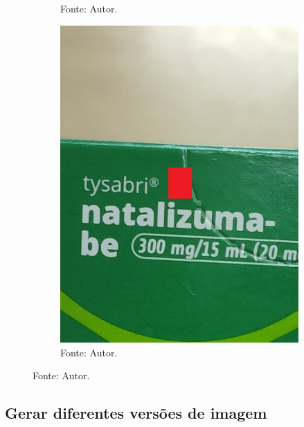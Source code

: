 \begin{figure}[htb]
\begin{subfigure}[t]{0.45\textwidth}
        \caption*{Fonte: Autor.}
    \end{subfigure}
    \hfill
    \begin{subfigure}[t]{0.45\textwidth}
        \centering
        \caption{Recorte ao redor da área destacada.}
        \label{fig:fotos:tysabri_cortado}
        \includegraphics[width=\linewidth]{../pictures/tysabri cortado.jpg}
        \caption*{Fonte: Autor.}
    \end{subfigure}
    \hfill
    \label{fig:fotos:tamanho}
\end{figure}


\begin{lstfloat}[htbp]
    \centering
    
    \caption*{Fonte: Autor.}
\end{lstfloat}

\subsection{Gerar diferentes versões de imagem}\label{ssec:versoes}

